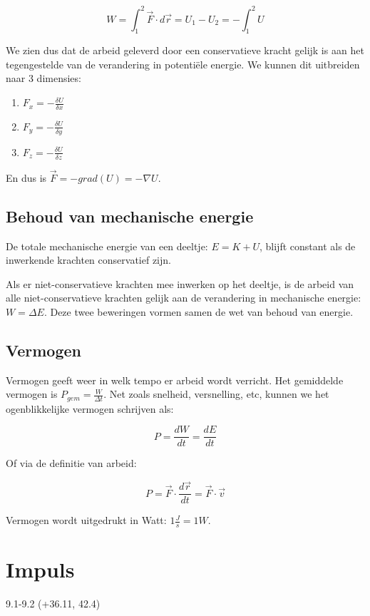 \documentclass[12pt,a4paper]{article}
\begin{document}
    $$W = \int_{1}^{2}\vec{F}\cdot d\vec{r} = U_1 - U_2 = -\int_{1}^{2} U$$
    
    We zien dus dat de arbeid geleverd door een conservatieve kracht gelijk is aan het tegengestelde van de verandering in potentiële energie. We kunnen
    dit uitbreiden naar 3 dimensies:
    
    \begin{enumerate}
    	\item $F_x = -\frac{\delta U}{\delta x}$
    	\item $F_y = -\frac{\delta U}{\delta y}$
    	\item $F_z = -\frac{\delta U}{\delta z}$
    \end{enumerate}
    
    En dus is $\vec{F} = -grad(U) = -\mathbb{\nabla}{U}$.

    \subsection{Behoud van mechanische energie}
    De totale mechanische energie van een deeltje: $E = K + U$,
    blijft constant als de inwerkende krachten conservatief zijn.
    
    Als er niet-conservatieve krachten mee inwerken op het deeltje, 
    is de arbeid van alle niet-conservatieve krachten gelijk aan de verandering
    in mechanische energie: $W = \Delta E$. Deze twee beweringen vormen
    samen de wet van behoud van energie.
    
    \subsection{Vermogen}
    Vermogen geeft weer in welk tempo er arbeid wordt verricht. Het gemiddelde vermogen is
    $P_{gem} = \frac{W}{\Delta t}$. Net zoals snelheid, versnelling, etc, kunnen we het ogenblikkelijke vermogen
    schrijven als:
    
    $$P = \frac{dW}{dt} = \frac{dE}{dt}$$
    
    Of via de definitie van arbeid:
    
    $$P = \vec{F} \cdot \frac{d\vec{r}}{dt} = \vec{F} \cdot \vec{v}$$ 
    
     Vermogen wordt uitgedrukt in Watt: $1 \frac{J}{s} = 1 W$.

    \section{Impuls}
    9.1-9.2 (+36.11, 42.4)
\end{document}
